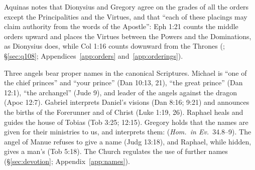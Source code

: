 Aquinas notes that Dionysius and Gregory agree on the grades of all the
orders except the Principalities and the Virtues, and that ``each of these
placings may claim authority from the words of the Apostle'': Eph 1:21
counts the middle orders upward and places the Virtues between the Powers
and the Dominations, as Dionysius does, while Col 1:16 counts downward from
the Thrones (; \S\ref{sec:q108}; Appendices~\ref{app:orders}
and~\ref{app:orderings}).

Three angels bear proper names in the canonical Scriptures. Michael is ``one
of the chief princes'' and ``your prince'' (Dan 10:13, 21), ``the great
prince'' (Dan 12:1), ``the archangel'' (Jude 9), and leader of the angels
against the dragon (Apoc 12:7). Gabriel interprets Daniel's visions (Dan
8:16; 9:21) and announces the births of the Forerunner and of Christ (Luke
1:19, 26). Raphael heals and guides the house of Tobias (Tob 3:25; 12:15).
Gregory holds that the names are given for their ministries to us, and
interprets them:  (\emph{Hom.\ in Ev.}\
34.8--9). The angel of Manue refuses to give a name (Judg 13:18), and
Raphael, while hidden, gives a man's (Tob 5:18). The Church regulates
the use of further names (\S\ref{sec:devotion}; Appendix~\ref{app:names}).
